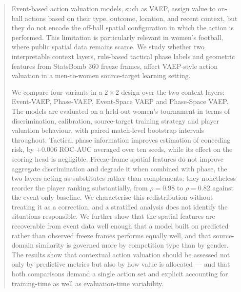 \documentclass[runningheads]{llncs}
\begin{document}
\maketitle
\begin{abstract}
Event-based action valuation models, such as VAEP, assign value to on-ball actions based on their type, outcome, location, and recent context, but they do not encode the off-ball spatial configuration in which the action is performed. This limitation is particularly relevant in women's football, where public spatial data remains scarce. We study whether two interpretable context layers, rule-based tactical phase labels and geometric features from StatsBomb 360 freeze frames, affect VAEP-style action valuation in a men-to-women source-target learning setting.

We compare four variants in a $2 \times 2$ design over the two context layers: Event-VAEP, Phase-VAEP, Event-Space VAEP and Phase-Space VAEP. The models are evaluated on a held-out women's tournament in terms of discrimination, calibration, source-target training strategy and player valuation behaviour, with paired match-level bootstrap intervals throughout. Tactical phase information improves estimation of conceding risk, by $+0.006$ ROC-AUC averaged over ten seeds, while its effect on the scoring head is negligible. Freeze-frame spatial features do not improve aggregate discrimination and degrade it when combined with phase, the two layers acting as substitutes rather than complements; they nonetheless reorder the player ranking substantially, from $\rho = 0.98$ to $\rho = 0.82$ against the event-only baseline. We characterise this redistribution without treating it as a correction, and a stratified analysis does not identify the situations responsible. We further show that the spatial features are recoverable from event data well enough that a model built on predicted rather than observed freeze frames performs equally well, and that source-domain similarity is governed more by competition type than by gender. The results show that contextual action valuation should be assessed not only by predictive metrics but also by how value is allocated --- and that both comparisons demand a single action set and explicit accounting for training-time as well as evaluation-time variability.

\end{abstract}
\end{document}
